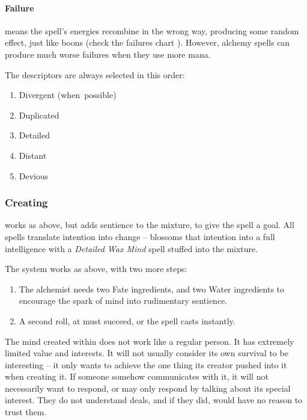\begin{multicols}{2}
\paragraph{Failure}
means the spell's energies recombine in the wrong way, producing some random effect, just like \glspl{boon} (check the failures chart ).
However, \gls{alchemy} spells can produce much worse failures when they use more mana.

The \glspl{descriptor} are always selected in this order:

\begin{multicols}{2}
  \begin{enumerate}
  \raggedright
    \item
    Divergent (when~possible)
    \item
    Duplicated
    \item
    Detailed
    \item
    Distant
    \item
    Devious
  \end{enumerate}
\end{multicols}

\subsubsection{Creating }
works as above, but adds sentience to the mixture, to give the spell a goal.
All spells translate intention into change --  blossoms that intention into a full intelligence with a \textit{Detailed Wax Mind} spell stuffed into the mixture.

The system works as above, with two more steps:

\begin{enumerate}
  \item
  The alchemist needs two Fate \glspl{ingredient}, and two Water \glspl{ingredient} to encourage the spark of mind into rudimentary sentience.
  \item
  A second roll, at \tn[9] must succeed, or the spell casts instantly.
\end{enumerate}

The mind created within  does not work like a regular person.
It has extremely limited value and interests.
It will not usually consider its own survival to be interesting -- it only wants to achieve the one thing its creator pushed into it when creating it.
If someone somehow communicates with it, it will not necessarily want to respond, or may only respond by talking about its special interest.
They do not understand deals, and if they did, would have no reason to trust them.

\end{multicols}
